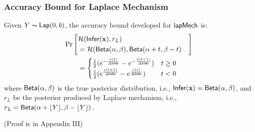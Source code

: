 \documentclass{article}
\begin{document}
\subsubsection{Accuracy Bound for Laplace Mechanism}
\label{subsec_accuracy_lap}
\begin{lem}
\label{lem_acc_lap}
Given $Y \thicksim \mathsf{Lap}(0, b)$, the accuracy bound developed for $\mathsf{lapMech}$ is:
\begin{align*}
&
\Pr\left[
\begin{aligned}
\lefteqn{\hellinger(\bysinfer(\dataobs), r_L )}\\ 
&= \hellinger(\betad(\alpha, \beta), \betad(\alpha + t, \beta - t)
\end{aligned}
\right]
\\
&\qquad = 
\begin{cases}
\frac{1}{2} (e^{- \frac{\epsilon (t)}{\Delta \bysinfer}} - e^{- \frac{\epsilon (t + 1)}{\Delta \bysinfer}}) &  t \geq 0\\
\frac{1}{2} (e^{\frac{\epsilon (t + 1)}{\Delta \bysinfer}} - e^{\frac{\epsilon (t)}{\Delta \bysinfer}}) & t < 0
\end{cases}
\end{align*}
where $\mathsf{Beta}(\alpha, \beta)$ is the true posterior distribution, i.e., $\mathsf{Infer}(\textbf{x}) = \mathsf{Beta}(\alpha, \beta)$, and $r_L$ be the posterior produced by Laplace mechanism, i.e., $r_L = \mathsf{Beta}(\alpha + \lfloor Y \rfloor, \beta - \lfloor Y \rfloor)$.
\end{lem}
(Proof is in Appendix III)
\end{document}
